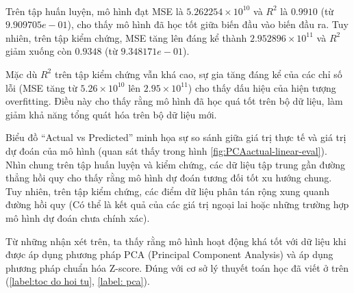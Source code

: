 \paragraph{}{
Trên tập huấn luyện, mô hình đạt MSE là \( 5.262254 \times 10^{10} \) và \( R^2 \) là \( 0.9910 \) (từ \( 9.909705e-01 \)), cho thấy mô hình đã học tốt giữa biến đầu vào biến đầu ra. Tuy nhiên, trên tập kiểm chứng, MSE tăng lên đáng kể thành \( 2.952896 \times 10^{11} \) và \( R^2 \) giảm xuống còn \( 0.9348 \) (từ \( 9.348171e-01 \)).

Mặc dù \( R^2 \) trên tập kiểm chứng vẫn khá cao, sự gia tăng đáng kể của các chỉ số lỗi (MSE tăng từ \( 5.26 \times 10^{10} \) lên \( 2.95 \times 10^{11} \)) cho thấy dấu hiệu của hiện tượng overfitting. Điều này cho thấy rằng mô hình đã học quá tốt trên bộ dữ liệu, làm giảm khả năng tổng quát hóa trên bộ dữ liệu mới.

Biểu đồ “Actual vs Predicted” minh họa sự so sánh giữa giá trị thực tế và giá trị dự đoán của mô hình (quan sát thấy trong hình \ref{fig:PCAactual-linear-eval}). Nhìn chung trên tập huấn luyện và kiểm chứng, các dữ liệu tập trung gần đường thẳng hồi quy cho thấy rằng mô hình dự đoán tương đối tốt xu hướng chung. Tuy nhiên, trên tập kiểm chứng, các điểm dữ liệu phân tán rộng xung quanh đường hồi quy (Có thể là kết quả của các giá trị ngoại lai hoặc những trường hợp mô hình dự đoán chưa chính xác).

Từ những nhận xét trên, ta thấy rằng mô hình hoạt động khá tốt với dữ liệu khi được áp dụng phương pháp PCA (Principal Component Analysis) và áp dụng phương pháp chuẩn hóa Z-score. Đúng với cơ sở lý thuyết toán học đã viết ở trên (\ref{label:toc do hoi tu}, \ref{label: pca}).
}


